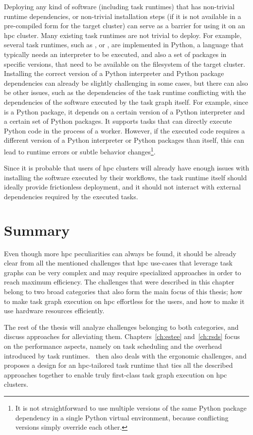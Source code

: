 Deploying any kind of software (including task runtimes) that has non-trivial runtime dependencies,
or non-trivial installation steps (if it is not available in a pre-compiled form for the target
cluster) can serve as a barrier for using it on an \gls{hpc} cluster. Many
existing task runtimes are not trivial to deploy. For example, several task runtimes, such as
\dask{}, \snakemake{} or \pycompss{}, are
implemented in Python, a language that typically needs an interpreter to be executed, and also a
set of packages in specific versions, that need to be available on the filesystem of the target
cluster. Installing the correct version of a Python interpreter and Python package dependencies can
already be slightly challenging in some cases, but there can also be other issues, such as the
dependencies of the task runtime conflicting with the dependencies of the software executed by the
task graph itself. For example, since \dask{} is a Python package, it depends
on a certain version of a Python interpreter and a certain set of Python packages. It supports
tasks that can directly execute Python code in the process of a \dask{} worker.
However, if the executed code requires a different version of a Python interpreter or Python
packages than \dask{} itself, this can lead to runtime errors or subtle
behavior changes\footnote{It is not straightforward to use multiple versions of the same Python package dependency in a
single Python virtual environment, because conflicting versions simply override each other.}.

Since it is probable that users of \gls{hpc} clusters will already have enough
issues with installing the software executed by their workflows, the task runtime itself should
ideally provide frictionless deployment, and it should not interact with external dependencies
required by the executed tasks.

\section*{Summary}
Even though more \gls{hpc} peculiarities can always be found, it should be
already clear from all the mentioned challenges that \gls{hpc} use-cases that
leverage task graphs can be very complex and may require specialized approaches in order to reach
maximum efficiency. The challenges that were described in this chapter belong to two broad
categories that also form the main focus of this thesis; how to make task graph execution on
\gls{hpc} effortless for the users, and how to make it use hardware resources
efficiently.

The rest of the thesis will analyze challenges belonging to both categories, and discuss approaches
for alleviating them. Chapters~\ref{ch:estee} and~\ref{ch:rsds} focus on
the performance aspects, namely on task scheduling and the overhead introduced by task
runtimes.~ then also deals with the ergonomic challenges, and proposes a
design for an \gls{hpc}-tailored task runtime that ties all the described
approaches together to enable truly first-class task graph execution on \gls{hpc}
clusters.
